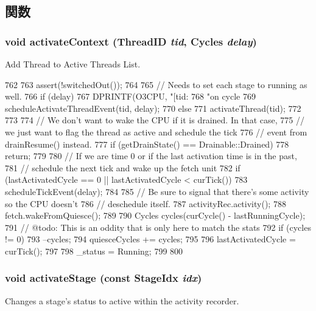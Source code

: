 \subsection{関数}
\hypertarget{classFullO3CPU_aadedce642b14c1bde1b3281767df99d4}{
\subsubsection[{activateContext}]{\setlength{\rightskip}{0pt plus 5cm}void activateContext ({\bf ThreadID} {\em tid}, \/  {\bf Cycles} {\em delay})}}
\label{classFullO3CPU_aadedce642b14c1bde1b3281767df99d4}
Add Thread to Active Threads List. 


\begin{DoxyCode}
762 {
763     assert(!switchedOut());
764 
765     // Needs to set each stage to running as well.
766     if (delay){
767         DPRINTF(O3CPU, "[tid:%
768                 "on cycle %
769         scheduleActivateThreadEvent(tid, delay);
770     } else {
771         activateThread(tid);
772     }
773 
774     // We don't want to wake the CPU if it is drained. In that case,
775     // we just want to flag the thread as active and schedule the tick
776     // event from drainResume() instead.
777     if (getDrainState() == Drainable::Drained)
778         return;
779 
780     // If we are time 0 or if the last activation time is in the past,
781     // schedule the next tick and wake up the fetch unit
782     if (lastActivatedCycle == 0 || lastActivatedCycle < curTick()) {
783         scheduleTickEvent(delay);
784 
785         // Be sure to signal that there's some activity so the CPU doesn't
786         // deschedule itself.
787         activityRec.activity();
788         fetch.wakeFromQuiesce();
789 
790         Cycles cycles(curCycle() - lastRunningCycle);
791         // @todo: This is an oddity that is only here to match the stats
792         if (cycles != 0)
793             --cycles;
794         quiesceCycles += cycles;
795 
796         lastActivatedCycle = curTick();
797 
798         _status = Running;
799     }
800 }
\end{DoxyCode}
\hypertarget{classFullO3CPU_a631f1fd5f15efc2953529efa22868bcd}{
\subsubsection[{activateStage}]{\setlength{\rightskip}{0pt plus 5cm}void activateStage (const {\bf StageIdx} {\em idx})}}
\label{classFullO3CPU_a631f1fd5f15efc2953529efa22868bcd}
Changes a stage's status to active within the activity recorder. 


